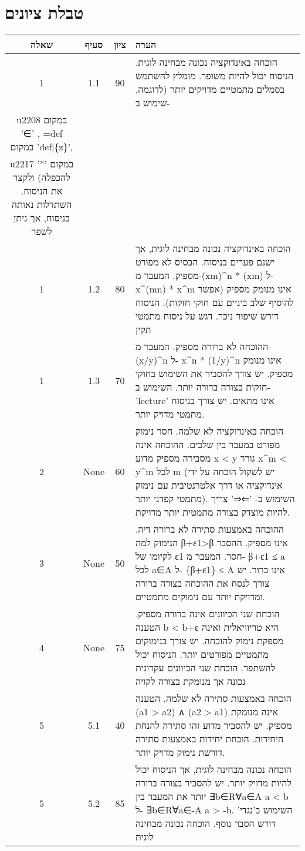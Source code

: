 \documentclass{article}
\begin{document}
\section*{טבלת ציונים}
\begin{RTL}
\begin{tabular}{|c|c|c|p{10cm}|}
\hline
שאלה & סעיף & ציון & הערה \\
\hline
1 & 1.1 & 90 & הוכחה באינדוקציה נכונה מבחינה לוגית.  הניסוח יכול להיות משופר.  מומלץ להשתמש בסמלים מתמטיים מדויקים יותר (לדוגמה, שימוש ב- \\u2208 במקום '∈' ,  =def במקום 'def|\{z\}',  \\u2217 במקום '*' להכפלה) ולקצר את הניסוח.  השתדלות נאותה בניסוח, אך ניתן לשפר \\ \hline
1 & 1.2 & 80 & הוכחה באינדוקציה נכונה מבחינה לוגית, אך ישנם פערים בניסוח.  הבסיס לא מפורט מספיק.  המעבר מ-(xm)\^{}n * (xm) ל- x\^{}(mn) * x\^{}m אינו מנומק מספיק (אפשר להוסיף שלב ביניים עם חוקי חזקות).  הניסוח דורש שיפור ניכר. דגש על ניסוח מתמטי תקין \\ \hline
1 & 1.3 & 70 & ההוכחה לא ברורה מספיק.  המעבר מ- (x/y)\^{}n ל- x\^{}n * (1/y)\^{}n אינו מנומק מספיק. יש צורך להסביר את השימוש בחוקי חזקות בצורה ברורה יותר.  השימוש ב- 'lecture' אינו מתאים.  יש צורך בניסוח מתמטי מדויק יותר. \\ \hline
2 & None & 60 & הוכחה באינדוקציה לא שלמה.  חסר נימוק מפורט במעבר בין שלבים.  ההוכחה אינה מסבירה מספיק מדוע x < y גורר x\^{}m < y\^{}m  לכל m  (יש לשקול הוכחה על ידי אינדוקציה או  דרך אלטרנטיבית  עם נימוק מתמטי קפדני יותר).  השימוש ב- '⇐⇒' צריך להיות מוצדק  בצורה מתמטית יותר מדויקת. \\ \hline
3 & None & 50 & ההוכחה באמצעות סתירה לא ברורה דיה.  הנימוק למה  β+ε1>β  אינו מספיק.  ההסבר לקיומו של ε1  חסר.  המעבר מ- β+ε1 ≤ a לכל a∈A ל- \{β+ε1\} ≤ A אינו ברור.  יש צורך לנסח את ההוכחה בצורה ברורה ומדויקת יותר עם נימוקים מתמטיים. \\ \hline
4 & None & 75 & הוכחת שני הכיוונים אינה ברורה מספיק.  הטענה b < b+ε היא טריוויאלית ואינה מספקת נימוק להוכחה.   יש צורך בנימוקים מתמטיים מפורטים יותר.  הניסוח יכול להשתפר.  הוכחת שני הכיוונים עקרונית נכונה אך מנומקת בצורה לקויה \\ \hline
5 & 5.1 & 40 & הוכחה באמצעות סתירה לא שלמה.  הטענה (a1 > a2) ∧ (a2 > a1) אינה מנומקת  מספיק.  יש להסביר מדוע זהו סתירה להנחת היחידות.  הוכחת יחידות באמצעות סתירה דורשת נימוק מדויק יותר. \\ \hline
5 & 5.2 & 85 & הוכחה נכונה מבחינה לוגית, אך הניסוח יכול להיות מדויק יותר.  יש להסביר בצורה ברורה יותר את המעבר בין  ∃b∈R∀a∈A a < b ל- ∃b∈R∀a∈-A a > -b.  השימוש ב'נגדי' דורש הסבר נוסף.  הוכחה נכונה מבחינה לוגית \\ \hline

\end{tabular}
\end{RTL}
\end{document}
